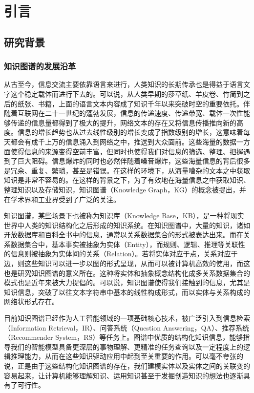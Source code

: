 \chapter{引言}
\label{cha:intro}


\section{研究背景}

\subsection{知识图谱的发展沿革}

从古至今，信息交流主要依靠语言来进行，人类知识的长期传承也是得益于语言文字这个稳定载体而进行下去的。可以说，从人类早期的莎草纸、羊皮卷、竹简到之后的纸张、书籍，上面的语言文本内容成了知识千年以来突破时空的重要依托。伴随着互联网在二十一世纪的蓬勃发展，信息的传递速度、传递带宽、载体一次性能够传递的信息量都得到了极大的提升，网络文本的存在又将信息传播推向新的高度。信息的增长趋势也从过去线性级别的增长变成了指数级别的增长，这意味着每天都会有成千上万的信息涌入到网络之中，推送到大众面前。这些海量的数据一方面使得信息的来源变得空前丰富，但同时也使得我们对信息的筛选、整理、把握遇到了巨大阻碍。信息爆炸的同时也必然伴随着噪音爆炸，这些海量信息的背后很多是冗余、重复、繁琐，甚至是错误。在这样的环境下，从海量嘈杂的文本之中获取知识是非常不容易的。在这样的背景之下，为了有效地在海量信息之中获取知识、整理知识以及存储知识，知识图谱（Knowledge Graph，KG）的概念被提出，并在学术界和工业界受到了广泛的关注。

知识图谱，某些场景下也被称为知识库（Knowledge Base，KB），是一种将现实世界中人类的知识结构化之后形成的知识系统。在知识图谱中，大量的知识，诸如开放数据库和百科全书中的信息，通常以关系数据集合的形式被表达出来。而在关系数据集合中，基本事实被抽象为实体（Entity），而规则、逻辑、推理等关联性的信息则被抽象为实体间的关系（Relation）。若将实体对应于点，关系对应于边，则这些知识可以进一步以图的形式呈现，从而可以被计算机高效的使用，而这也是研究知识图谱的意义所在。这种将实体和抽象概念结构化成多关系数据集合的模式也是近年来被大力提倡的。可以说，知识图谱使得我们接触到的信息，尤其是知识信息，突破了以往文本字符串中基本的线性构成形式，而以实体与关系构成的网络状形式存在。

目前知识图谱已经作为人工智能领域的一项基础核心技术，被广泛引入到信息检索（Information Retrieval，IR）、问答系统（Question Answering，QA）、推荐系统（Recommender System，RS）等任务上。图谱中优质的结构化知识信息，能够指导我们的智能模型具备更深层的事物理解、更精准的任务查询以及一定程度上的逻辑推理能力，从而在这些知识驱动应用中起到至关重要的作用。可以毫不夸张的说，正是由于这些结构化知识图谱的存在，我们建模实体以及实体之间的关联变的容易起来，让计算机能够理解知识、运用知识甚至于发掘创造知识的想法也逐渐具有了可行性。

